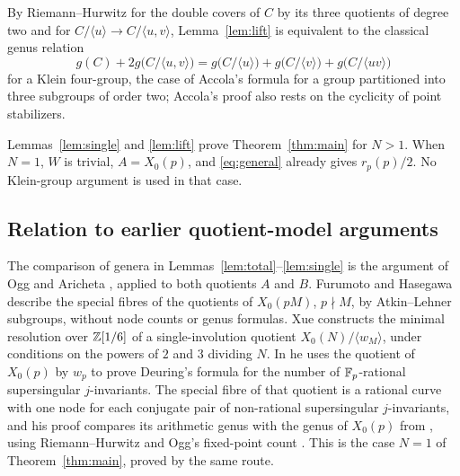 \documentclass[11pt,a4paper]{article}
\theoremstyle{remark}\newtheorem{remark}[theorem]{Remark}
\numberwithin{equation}{section}
\begin{document}
	By Riemann--Hurwitz for the double covers of $C$ by its three quotients of degree two and for $C/\langle u\rangle\to C/\langle u,v\rangle$, Lemma~\ref{lem:lift} is equivalent to the classical genus relation
	\[
	g(C)+2g\bigl(C/\langle u,v\rangle\bigr)=g\bigl(C/\langle u\rangle\bigr)+g\bigl(C/\langle v\rangle\bigr)+g\bigl(C/\langle uv\rangle\bigr)
	\]
	for a Klein four-group, the case of Accola's formula \cite[Theorem 1, Corollary, eq.~(11), p.~600]{Accola} for a group partitioned into three subgroups of order two; Accola's proof also rests on the cyclicity of point stabilizers.
	
	Lemmas~\ref{lem:single} and \ref{lem:lift} prove Theorem~\ref{thm:main} for $N>1$. When $N=1$, $W$ is trivial, $A=X_0(p)$, and \eqref{eq:general} already gives $r_p(p)/2$. No Klein-group argument is used in that case.
	
	\subsection{Relation to earlier quotient-model arguments}\label{sec:prior}
	The comparison of genera in Lemmas~\ref{lem:total}--\ref{lem:single} is the argument of Ogg \cite{OggRed} and Aricheta \cite[Theorem 3.1]{Aricheta}, applied to both quotients $A$ and $B$. Furumoto and Hasegawa \cite[Section 5]{FH} describe the special fibres of the quotients of $X_0(pM)$, $p\nmid M$, by Atkin--Lehner subgroups, without node counts or genus formulas. Xue \cite{Xue} constructs the minimal resolution over $\mathbb Z[1/6]$ of a single-involution quotient $X_0(N)/\langle w_M\rangle$, under conditions on the powers of $2$ and $3$ dividing $N$. In \cite[Section 7.1, Theorem 2]{Xue} he uses the quotient of $X_0(p)$ by $w_p$ to prove Deuring's formula for the number of $\mathbb F_p$-rational supersingular $j$-invariants. The special fibre of that quotient is a rational curve with one node for each conjugate pair of non-rational supersingular $j$-invariants, and his proof compares its arithmetic genus with the genus of $X_0(p)$ from \cite[VI, Theorem 6.9]{DR}, using Riemann--Hurwitz and Ogg's fixed-point count \cite[p.~454]{Ogg}. This is the case $N=1$ of Theorem~\ref{thm:main}, proved by the same route.
	
\end{document}
